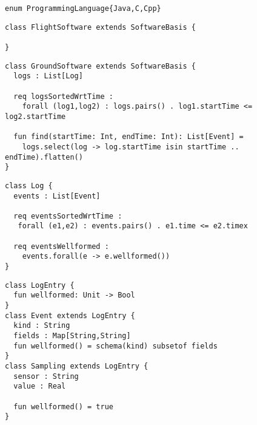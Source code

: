 \sk
\begin{lstlisting}
enum ProgrammingLanguage{Java,C,Cpp}
\end{lstlisting}

\sk
\begin{lstlisting}
class FlightSoftware extends SoftwareBasis {

}
\end{lstlisting}

\sk
\begin{lstlisting}
class GroundSoftware extends SoftwareBasis {
  logs : List[Log]

  req logsSortedWrtTime :
    forall (log1,log2) : logs.pairs() . log1.startTime <= log2.startTime

  fun find(startTime: Int, endTime: Int): List[Event] =
    logs.select(log -> log.startTime isin startTime .. endTime).flatten()
}
\end{lstlisting}

\sk
\begin{lstlisting}
class Log {
  events : List[Event]

  req eventsSortedWrtTime :
   forall (e1,e2) : events.pairs() . e1.time <= e2.timex

  req eventsWellformed :
    events.forall(e -> e.wellformed())
}
\end{lstlisting}

\sk
\begin{lstlisting}
class LogEntry {
  fun wellformed: Unit -> Bool
}
class Event extends LogEntry {
  kind : String
  fields : Map[String,String]
  fun wellformed() = schema(kind) subsetof fields
}
class Sampling extends LogEntry {
  sensor : String
  value : Real

  fun wellformed() = true
}
\end{lstlisting}


\noindent
